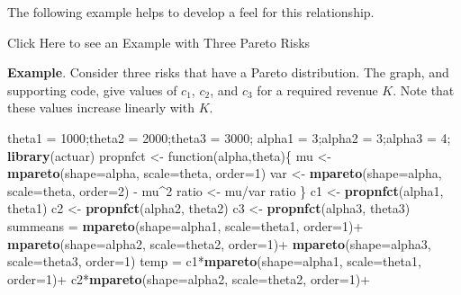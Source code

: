 \documentclass[]{book}
\newenvironment{Shaded}{\begin{snugshade}}{\end{snugshade}}
\newcommand{\KeywordTok}[1]{\textcolor[rgb]{0.13,0.29,0.53}{\textbf{{#1}}}}
\newcommand{\DataTypeTok}[1]{\textcolor[rgb]{0.13,0.29,0.53}{{#1}}}
\newcommand{\DecValTok}[1]{\textcolor[rgb]{0.00,0.00,0.81}{{#1}}}
\newcommand{\StringTok}[1]{\textcolor[rgb]{0.31,0.60,0.02}{{#1}}}
\newcommand{\NormalTok}[1]{{#1}}
\theoremstyle{definition}
\theoremstyle{definition}
\theoremstyle{definition}
\theoremstyle{remark}
\begin{document}
The following example helps to develop a feel for this relationship.

Click Here to see an Example with Three Pareto Risks

\hypertarget{toggleParetoRisksProp}{}
\textbf{Example}. Consider three risks that have a Pareto distribution.
The graph, and supporting code, give values of \(c_1\), \(c_2\), and
\(c_3\) for a required revenue \(K\). Note that these values increase
linearly with \(K\).

\begin{Shaded}
\begin{Highlighting}[]
\NormalTok{theta1 =}\StringTok{ }\DecValTok{1000}\NormalTok{;theta2 =}\StringTok{ }\DecValTok{2000}\NormalTok{;theta3 =}\StringTok{ }\DecValTok{3000}\NormalTok{;}
\NormalTok{alpha1 =}\StringTok{ }\DecValTok{3}\NormalTok{;alpha2 =}\StringTok{ }\DecValTok{3}\NormalTok{;alpha3 =}\StringTok{ }\DecValTok{4}\NormalTok{;}
\KeywordTok{library}\NormalTok{(actuar)}
\NormalTok{propnfct <-}\StringTok{ }\NormalTok{function(alpha,theta)\{}
  \NormalTok{mu    <-}\StringTok{ }\KeywordTok{mpareto}\NormalTok{(}\DataTypeTok{shape=}\NormalTok{alpha, }\DataTypeTok{scale=}\NormalTok{theta, }\DataTypeTok{order=}\DecValTok{1}\NormalTok{)}
  \NormalTok{var   <-}\StringTok{ }\KeywordTok{mpareto}\NormalTok{(}\DataTypeTok{shape=}\NormalTok{alpha, }\DataTypeTok{scale=}\NormalTok{theta, }\DataTypeTok{order=}\DecValTok{2}\NormalTok{) -}\StringTok{ }\NormalTok{mu^}\DecValTok{2}
  \NormalTok{ratio <-}\StringTok{ }\NormalTok{mu/var}
  \NormalTok{ratio}
\NormalTok{\}}
\NormalTok{c1 <-}\StringTok{ }\KeywordTok{propnfct}\NormalTok{(alpha1, theta1)}
\NormalTok{c2 <-}\StringTok{ }\KeywordTok{propnfct}\NormalTok{(alpha2, theta2)}
\NormalTok{c3 <-}\StringTok{ }\KeywordTok{propnfct}\NormalTok{(alpha3, theta3)}
\NormalTok{summeans =}\StringTok{ }\KeywordTok{mpareto}\NormalTok{(}\DataTypeTok{shape=}\NormalTok{alpha1, }\DataTypeTok{scale=}\NormalTok{theta1, }\DataTypeTok{order=}\DecValTok{1}\NormalTok{)+}
\StringTok{           }\KeywordTok{mpareto}\NormalTok{(}\DataTypeTok{shape=}\NormalTok{alpha2, }\DataTypeTok{scale=}\NormalTok{theta2, }\DataTypeTok{order=}\DecValTok{1}\NormalTok{)+}
\StringTok{           }\KeywordTok{mpareto}\NormalTok{(}\DataTypeTok{shape=}\NormalTok{alpha3, }\DataTypeTok{scale=}\NormalTok{theta3, }\DataTypeTok{order=}\DecValTok{1}\NormalTok{)  }
\NormalTok{temp =}\StringTok{ }\NormalTok{c1*}\KeywordTok{mpareto}\NormalTok{(}\DataTypeTok{shape=}\NormalTok{alpha1, }\DataTypeTok{scale=}\NormalTok{theta1, }\DataTypeTok{order=}\DecValTok{1}\NormalTok{)+}
\StringTok{       }\NormalTok{c2*}\KeywordTok{mpareto}\NormalTok{(}\DataTypeTok{shape=}\NormalTok{alpha2, }\DataTypeTok{scale=}\NormalTok{theta2, }\DataTypeTok{order=}\DecValTok{1}\NormalTok{)+}

\end{Highlighting}
\end{Shaded}
\end{document}
